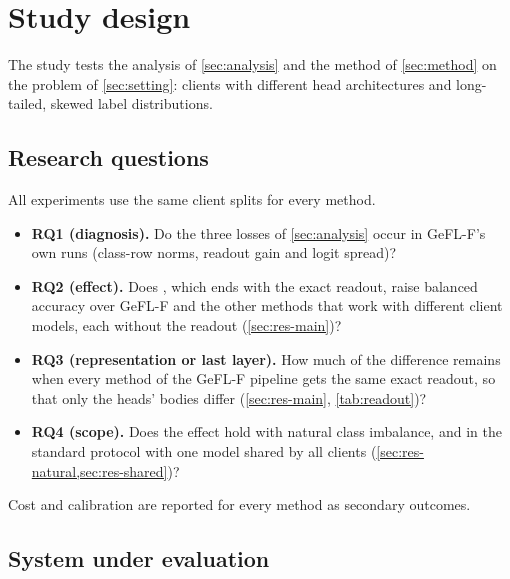 \section{Study design}\label{sec:setup}

The study tests the analysis of \cref{sec:analysis} and the method of \cref{sec:method} on the problem of
\cref{sec:setting}: clients with different head architectures and long-tailed, skewed label distributions.

\subsection{Research questions}\label{sec:setup-rq}

All experiments use the same client splits for every method.
\begin{itemize}
\item \textbf{RQ1 (diagnosis).} Do the three losses of \cref{sec:analysis} occur in GeFL-F's own runs (class-row
norms, readout gain and logit spread)?
\item \textbf{RQ2 (effect).} Does \ours, which ends with the exact readout, raise balanced accuracy over GeFL-F and the
other methods that work with different client models, each without the readout (\cref{sec:res-main})?
\item \textbf{RQ3 (representation or last layer).} How much of the difference remains when every method of the
GeFL-F pipeline gets the same exact readout, so that only the heads' bodies differ (\cref{sec:res-main},
\cref{tab:readout})?
\item \textbf{RQ4 (scope).} Does the effect hold with natural class imbalance, and in the standard protocol with one model shared by all clients
(\cref{sec:res-natural,sec:res-shared})?
\end{itemize}
Cost and calibration are reported for every method as secondary outcomes.

\subsection{System under evaluation}\label{sec:setup-system}

